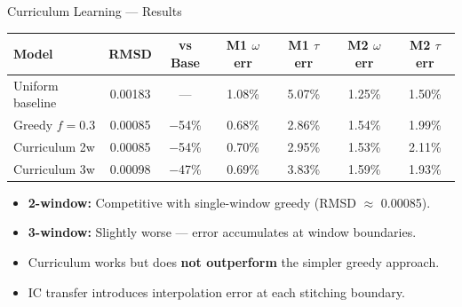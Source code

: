 \documentclass[aspectratio=169, 11pt]{beamer}
\begin{document}
\begin{frame}{Curriculum Learning --- Results}
  \begin{center}
    \footnotesize
    \begin{tabular}{@{}lcccccc@{}}
      \toprule
      \textbf{Model} & \textbf{RMSD} & \textbf{vs Base}
        & \textbf{M1 $\omega$ err} & \textbf{M1 $\tau$ err}
        & \textbf{M2 $\omega$ err} & \textbf{M2 $\tau$ err} \\
      \midrule
      Uniform baseline       & 0.00183 & ---     & 1.08\% & 5.07\% & 1.25\% & 1.50\% \\
      Greedy $f\!=\!0.3$     & 0.00085 & $-$54\% & 0.68\% & 2.86\% & 1.54\% & 1.99\% \\
      \midrule
      \rowcolor{green!10}
      Curriculum 2w          & 0.00085 & $-$54\% & 0.70\% & 2.95\% & 1.53\% & 2.11\% \\
      Curriculum 3w          & 0.00098 & $-$47\% & 0.69\% & 3.83\% & 1.59\% & 1.93\% \\
      \bottomrule
    \end{tabular}
  \end{center}

  \medskip
  \begin{itemize}
    \item \textbf{2-window:} Competitive with single-window greedy
          (RMSD $\approx$ 0.00085).
    \item \textbf{3-window:} Slightly worse ---
          error accumulates at window boundaries.
    \item Curriculum works but does \textbf{not outperform}
          the simpler greedy approach.
    \item IC transfer introduces interpolation error at each stitching boundary.
  \end{itemize}
\end{frame}
\end{document}
